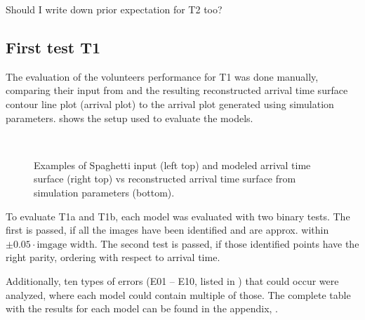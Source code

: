 \todo{!} Should I write down prior expectation for T2 too?




\subsection{First test T1} \label{sec:tests.t1}

The evaluation of the volunteers performance for T1 was done manually, comparing their input from \spl and the resulting reconstructed arrival time surface contour line plot (arrival plot) to the arrival plot generated using simulation parameters.
 shows the setup used to evaluate the models.

\begin{figure}
  \centering
   \\
  \caption{Examples of Spaghetti input (left top) and modeled arrival time surface (right top) vs reconstructed arrival time surface from simulation parameters (bottom).}
  \label{fig:output_compare}
\end{figure}

To evaluate T1a and T1b, each model was evaluated with two binary tests.
The first is passed, if all the images have been identified and are approx. within $\pm0.05\cdot\text{imgage width}$.
The second test is passed, if those identified points have the right parity, ordering with respect to arrival time.

Additionally, ten types of errors (E01 -- E10, listed in ) that could occur were analyzed, where each model could contain multiple of those.
The complete table with the results for each model can be found in the appendix, .

